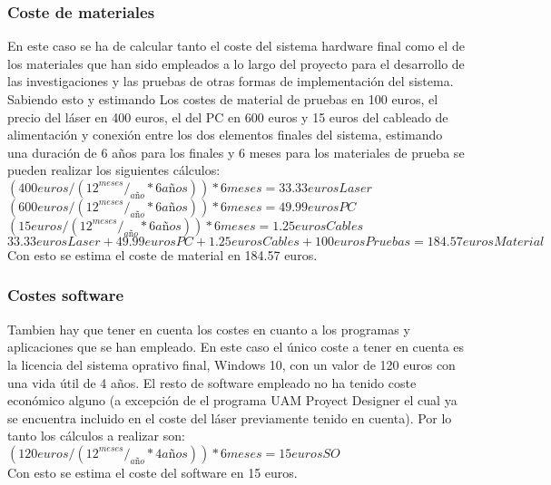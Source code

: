 \subsubsection{Coste de materiales}
En este caso se ha de calcular tanto el coste del sistema hardware final como el de los materiales que han sido empleados a lo largo del proyecto para el desarrollo de las investigaciones y las pruebas de otras formas de implementación del sistema. Sabiendo esto y estimando Los costes de material de pruebas en 100 euros, el precio del láser en 400 euros, el del PC en 600 euros y 15 euros del cableado de alimentación y conexión entre los dos elementos finales del sistema, estimando una duración de 6 años para los finales y 6 meses para los materiales de prueba se pueden realizar los siguientes cálculos: \\
$(400 euros / (12 ^{meses}/_{año} * 6 años)) * 6 meses = 33.33 eurosLaser$\\
$(600 euros / (12 ^{meses}/_{año} * 6 años)) * 6 meses = 49.99 eurosPC$\\
$(15 euros / (12 ^{meses}/_{año} * 6 años)) * 6 meses = 1.25 eurosCables$\\
$33.33 eurosLaser + 49.99 eurosPC + 1.25 eurosCables + 100 eurosPruebas = 184.57 eurosMaterial$\\
Con esto se estima el coste de material en 184.57 euros.\\

\subsubsection{Costes software}
Tambien hay que tener en cuenta los costes en cuanto a los programas y aplicaciones que se han empleado. En este caso el único coste a tener en cuenta es la licencia del sistema oprativo final, Windows 10, con un valor de 120 euros con una vida útil de 4 años. El resto de software empleado no ha tenido coste económico alguno (a excepción de el programa UAM Proyect Designer el cual ya se encuentra incluido en el coste del láser previamente tenido en cuenta). Por lo tanto los cálculos a realizar son:\\
$(120 euros / (12 ^{meses}/_{año} * 4 años)) * 6 meses = 15 eurosSO$\\
Con esto se estima el coste del software en 15 euros.\\

